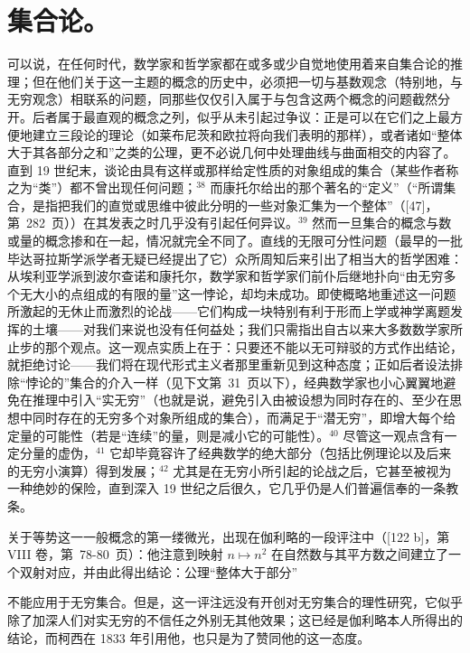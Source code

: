 \section*{集合论。}
{}

可以说，在任何时代，数学家和哲学家都在或多或少自觉地使用着来自集合论的推理；但在他们关于这一主题的概念的历史中，必须把一切与基数观念（特别地，与无穷观念）相联系的问题，同那些仅仅引入属于与包含这两个概念的问题截然分开。后者属于最直观的概念之列，似乎从未引起过争议：正是可以在它们之上最方便地建立三段论的理论（如莱布尼茨和欧拉将向我们表明的那样），或者诸如“整体大于其各部分之和”之类的公理，更不必说几何中处理曲线与曲面相交的内容了。直到 19 世纪末，谈论由具有这样或那样给定性质的对象组成的集合（某些作者称之为“类”）都不曾出现任何问题；\(^{38}\) 而康托尔给出的那个著名的“定义”（“所谓集合，是指把我们的直觉或思维中彼此分明的一些对象汇集为一个整体”（{[}47{]}，第~282~页））在其发表之时几乎没有引起任何异议。\(^{39}\) 然而一旦集合的概念与数或量的概念掺和在一起，情况就完全不同了。直线的无限可分性问题（最早的一批毕达哥拉斯学派学者无疑已经提出了它）众所周知后来引出了相当大的哲学困难：从埃利亚学派到波尔查诺和康托尔，数学家和哲学家们前仆后继地扑向“由无穷多个无大小的点组成的有限的量”这一悖论，却均未成功。即使概略地重述这一问题所激起的无休止而激烈的论战——它们构成一块特别有利于形而上学或神学离题发挥的土壤——对我们来说也没有任何益处；我们只需指出自古以来大多数数学家所止步的那个观点。这一观点实质上在于：只要还不能以无可辩驳的方式作出结论，就拒绝讨论——我们将在现代形式主义者那里重新见到这种态度；正如后者设法排除“悖论的”集合的介入一样（见下文第~31~页以下），经典数学家也小心翼翼地避免在推理中引入“实无穷”（也就是说，避免引入由被设想为同时存在的、至少在思想中同时存在的无穷多个对象所组成的集合），而满足于“潜无穷”，即增大每个给定量的可能性（若是“连续”的量，则是减小它的可能性）。\(^{40}\) 尽管这一观点含有一定分量的虚伪，\(^{41}\) 它却毕竟容许了经典数学的绝大部分（包括比例理论以及后来的无穷小演算）得到发展；\(^{42}\) 尤其是在无穷小所引起的论战之后，它甚至被视为一种绝妙的保险，直到深入 19 世纪之后很久，它几乎仍是人们普遍信奉的一条教条。

关于等势这一一般概念的第一缕微光，出现在伽利略的一段评注中（{[}122 b{]}，第 VIII 卷，第~78-80~页）：他注意到映射 \(n \mapsto n^2\) 在自然数与其平方数之间建立了一个双射对应，并由此得出结论：公理“整体大于部分”

不能应用于无穷集合。但是，这一评注远没有开创对无穷集合的理性研究，它似乎除了加深人们对实无穷的不信任之外别无其他效果；这已经是伽利略本人所得出的结论，而柯西在 1833 年引用他，也只是为了赞同他的这一态度。

